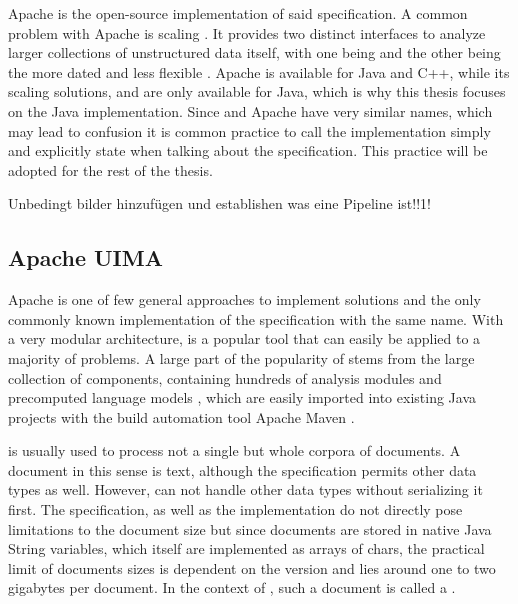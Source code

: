 Apache \uima{} is the open-source implementation of said \uima{} specification. A common problem with Apache \uima{} is scaling \cite{divita2015scaling,epstein2012making,ramakrishnan2010building}. It  provides two distinct interfaces to analyze larger collections of unstructured data itself, with one being \uimaas{} and the other being the more dated and less flexible \cpe{} \cite{OASIS:UIMA:2009}.
Apache \uima{} is available for Java and C++, while its scaling solutions, \uimacpe{} and \uimaas{} are only available for Java, which is why this thesis focuses on the Java implementation. Since \uima{} and Apache \uima{} have very similar names, which may lead to confusion it is common practice to call the implementation simply \uima{} and explicitly state when talking about the specification. This practice will be adopted for the rest of the thesis.




Unbedingt bilder hinzufügen und establishen was eine Pipeline ist!!1!

\subsection{Apache UIMA}

Apache \uima{} is one of few general approaches to implement \nlp{} solutions and the only commonly known implementation of the specification with the same name. With a very modular architecture, \uima{} is a popular tool that can easily be applied to a majority of \nlp{} problems. A large part of the popularity of \uima{} stems from the large \dkpro{} collection of components, containing hundreds of analysis modules and precomputed language models \cite{eckartdecastilho-gurevych:2014:OIAF4HLT}, which are easily imported into existing Java projects with the build automation tool Apache Maven \cite{dkpro}.

\uima{} is usually used to process not a single but whole corpora of documents. A document in this sense is text, although the \uima{} specification permits other data types as well. However, \uima{} can not handle other data types without serializing it first. The \uima{} specification, as well as the implementation do not directly pose limitations to the document size but since documents are stored in native Java String variables, which itself are implemented as arrays of chars, the practical limit of documents sizes is dependent on the \jvm{} version and lies around one to two gigabytes \cite{so:javastrings} per document. In the context of \uima{}, such a document is called a \sofa{}.

